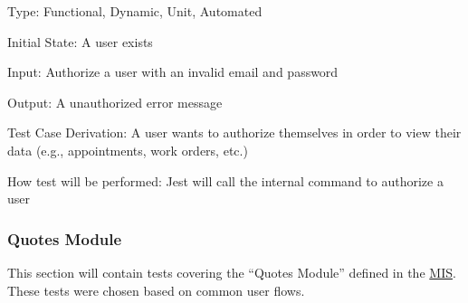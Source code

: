 \documentclass[12pt, titlepage]{article}
\begin{document}
\begin{enumerate}
	      Type: Functional, Dynamic, Unit, Automated

	      Initial State: A user exists

	      Input: Authorize a user with an invalid email and password

	      Output: A unauthorized error message

	      Test Case Derivation: A user wants to authorize themselves in order to view their data (e.g.,
	      appointments, work orders, etc.)

	      How test will be performed: Jest will call the internal command to authorize a user

\end{enumerate}

\subsubsection{Quotes Module}

This section will contain tests covering the ``Quotes Module'' defined in the
\href{https://github.com/arkinmodi/project-sayyara/blob/main/docs/Design/SoftDetailedDes/MIS.pdf}{MIS}.
These tests were chosen based on common user flows.
\end{document}
